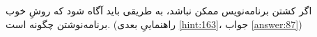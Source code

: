 \section{}
\paragraph{}\label{hint:272}
اگر کشتن برنامه‌نویس ممکن نباشد، به طریقی باید آگاه شود که روشِ خوب برنامه‌نوشتن چگونه است. (راهنماییِ بعدی \ref{hint:163}، جواب \ref{answer:87})